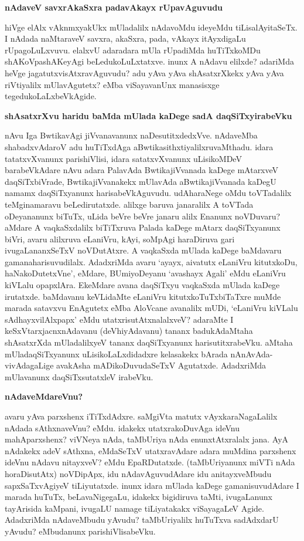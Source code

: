 {\bigskip
\noindent
{\large\bf nAdaveV savxrAkaSxra padavAkayx rUpavAguvudu}}\label{page141b}
\medskip

\noindent
hiVge elAlx vAknmxyakUkx mUladalilx nAdavoMdu ideyeMdu tiLisalAyitaSeTx. I nAdada naMtaraveV savxra, akaSxra, pada, vAkayx itAyxdigaLu rUpagoLuLxvuvu. elalxvU adaradara mUla rUpadiMda huTiTxkoMDu shAKoVpashAKeyAgi beLedukoLuLxtatxve. inunx A nAdavu elilxde? adariMda heVge jagatutxvisAtxravAguvudu? adu yAva yAva shAsatxrXkekx yAva yAva riVtiyalilx mUlavAgutetx? eMba viSayavanUnx manasisxge tegedukoLaLxbeVkAgide.

{\bigskip
\noindent
{\large\bf shAsatxrXvu haridu baMda mUlada kaDege sadA daqSiTxyirabeVku}}\label{page142}
\medskip

\noindent
nAvu Iga BwtikavAgi jiVvanavanunx naDesutitxdedxVve. nAdaveMba shabadxvAdaroV adu huTiTxdAga aBwtikasithxtiyalilxruvaMthadu. idara tatatxvXvanunx parishiVlisi, idara satatxvXvanunx uLisikoMDeV barabeVkAdare nAvu adara PalavAda BwtikajiVvanada kaDege mAtarxveV daqSiTxbiVrade, BwtikajiVvanakekx mUlavAda aBwtikajiVvanada kaDegU namamx daqSiTxyanunx harisabeVkAguvudu. udAharaNege oMdu toVTadalilx teMginamaravu beLedirutatxde. alilxge baruva janaralilx A toVTada oDeyananunx biTuTx, uLida beVre beVre janaru alilx Enanunx noVDuvaru? aMdare A vaqkaSxdalilx biTiTxruva Palada kaDege mAtarx daqSiTxyanunx biVri, avaru alilxruva eLaniVru, kAyi, soMpAgi haraDiruva gari ivugaLananxSeTxV noVDutAtxre. A vaqkaSxda mUlada kaDege baMdavaru gamanaharisuvudilalx. AdadxriMda avaru `ayayx, aivatutx eLaniVru kitutxkoDu, haNakoDutetxVne', eMdare, BUmiyoDeyanu `avashayx Agali' eMdu eLaniVru kiVLalu opapxlAra. EkeMdare avana daqSiTxyu vaqkaSxda mUlada kaDege irutatxde. baMdavanu keVLidaMte eLaniVru kitutxkoTuTxbiTaTxre muMde marada satavxvu EnAgutetx eMba AloVcane avanalilx mUDi, `eLaniVru kiVLalu sAdhayxvilAlxpapx' eMdu utatxrisutAtxnalalxveV? adaraMte I keSxVtarxjacnxnAdavanu (deVhiyAdavanu) tananx badukAdaMtaha shAsatxrXda mUladalilxyeV tananx daqSiTxyanunx harisutitxrabeVku. aMtaha mUladaqSiTxyanunx uLisikoLaLxdidadxre kelasakekx bArada nAnAvAda-vivAdagaLige avakAsha mADikoDuvudaSeTxV Agutatxde. AdadxriMda mUlavanunx daqSiTxsutatxleV irabeVku.

{\bigskip
\noindent
{\large\bf nAdaveMdareVnu?}}\label{page142a}
\medskip

\noindent
avaru yAva parxshenx iTiTxdAdxre. saMgiVta matutx vAyxkaraNagaLalilx nAdada sAthxnaveVnu? eMdu. idakekx utatxrakoDuvAga ideVnu mahAparxshenx? viVNeya nAda, taMbUriya nAda enunxtAtxralalx jana. AyA nAdakekx adeV sAthxna, eMdaSeTxV utatxravAdare adara muMdina parxshenx ideVnu nAdavu nitayxveV? eMdu EpaRDutatxde. (taMbUriyanunx miVTi nAda horaDisutAtx) noVDipApx, idu nAdavAguvudAdare idu anitayxveMbudu sapxSaTxvAgiyeV tiLiyutatxde. inunx idara mUlada kaDege gamanisuvudAdare I marada huTuTx, beLavaNigegaLu, idakekx bigidiruva taMti, ivugaLanunx tayArisida kaMpani, ivugaLU namage tiLiyatakakx viSayagaLeV Agide. AdadxriMda nAdaveMbudu yAvudu? taMbUriyalilx huTuTxva sadAdxdarU yAvudu? eMbudanunx parishiVlisabeVku. 

